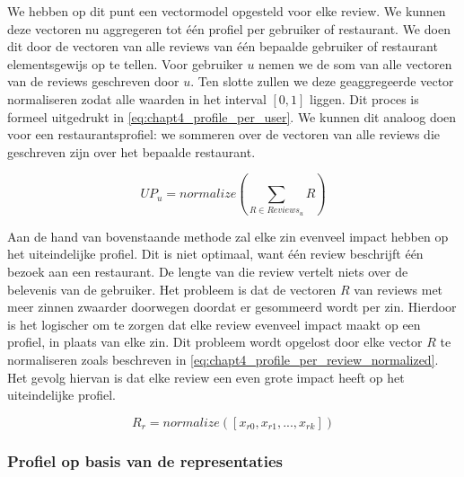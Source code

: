 We hebben op dit punt een vectormodel opgesteld voor elke review. We kunnen deze vectoren nu aggregeren tot één profiel per gebruiker of restaurant. We doen dit door de vectoren van alle reviews van één bepaalde gebruiker of restaurant elementsgewijs op te tellen. Voor gebruiker $u$ nemen we de som van alle vectoren van de reviews geschreven door $u$. Ten slotte zullen we deze geaggregeerde vector normaliseren zodat alle waarden in het interval $[0, 1]$ liggen. Dit proces is formeel uitgedrukt in \autoref{eq:chapt4_profile_per_user}. We kunnen dit analoog doen voor een restaurantsprofiel: we sommeren over de vectoren van alle reviews die geschreven zijn over het bepaalde restaurant.

\begin{equation}
\label{eq:chapt4_profile_per_user}
    UP_{u} = normalize(\sum_{R \in Reviews_u}R)
\end{equation}

Aan de hand van bovenstaande methode zal elke zin evenveel impact hebben op het uiteindelijke profiel. Dit is niet optimaal, want één review beschrijft één bezoek aan een restaurant. De lengte van die review vertelt niets over de belevenis van de gebruiker. Het probleem is dat de vectoren $R$ van reviews met meer zinnen zwaarder doorwegen doordat er gesommeerd wordt per zin.\newline
Hierdoor is het logischer om te zorgen dat elke review evenveel impact maakt op een profiel, in plaats van elke zin.  Dit probleem wordt opgelost door elke vector $R$ te normaliseren zoals beschreven in \autoref{eq:chapt4_profile_per_review_normalized}. Het gevolg hiervan is dat elke review een even grote impact heeft op het uiteindelijke profiel.

\begin{equation}
\label{eq:chapt4_profile_per_review_normalized}
    R_r = normalize([x_{r0}, x_{r1}, ..., x_{rk}])
\end{equation}

\subsubsection{Profiel op basis van de representaties}
\label{sub:chapt4_profile_repesentaties}

